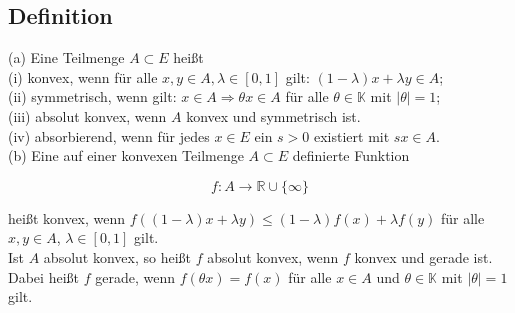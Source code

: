 \documentclass[10pt, letterpaper]{article}
\begin{document}
\subsection*{Definition}
(a) Eine Teilmenge $A \subset E$ heißt\\
(i) konvex, wenn für alle $x, y \in A, \lambda \in[0,1]$ gilt: $(1-\lambda) x+\lambda y \in A$;\\
(ii) symmetrisch, wenn gilt: $x \in A \Longrightarrow \theta x \in A$ für alle $\theta \in \mathbb{K}$ mit $|\theta|=1$;\\
(iii) absolut konvex, wenn $A$ konvex und symmetrisch ist.\\
(iv) absorbierend, wenn für jedes $x \in E$ ein $s>0$ existiert mit $s x \in A$.\\
(b) Eine auf einer konvexen Teilmenge $A \subset E$ definierte Funktion

$$
f: A \rightarrow \mathbb{R} \cup\{\infty\}
$$

heißt konvex, wenn $f((1-\lambda) x+\lambda y) \leq(1-\lambda) f(x)+\lambda f(y)$ für alle $x, y \in A$, $\lambda \in[0,1]$ gilt.\\
Ist $A$ absolut konvex, so heißt $f$ absolut konvex, wenn $f$ konvex und gerade ist. Dabei heißt $f$ gerade, wenn $f(\theta x)=f(x)$ für alle $x \in A$ und $\theta \in \mathbb{K}$ mit $|\theta|=1$ gilt.
\end{document}

